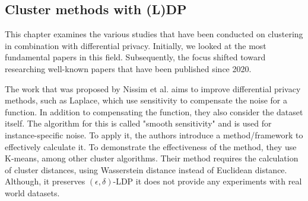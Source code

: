 \subsection{Cluster methods with (L)DP}
This chapter examines the various studies that have been conducted on clustering in combination with differential privacy.
Initially, we looked at the most fundamental papers in this field. Subsequently, the focus shifted toward researching well-known papers that have been published since 2020.

The work that was proposed by Nissim et al. aims to improve differential privacy methods, such as Laplace, which use sensitivity to compensate the noise for a function.
In addition to compensating the function, they also consider the dataset itself.
The algorithm for this is called "smooth sensitivity" and is used for instance-specific noise.
To apply it, the authors introduce a method/framework to effectively calculate it.
To demonstrate the effectiveness of the method, they use K-means, among other cluster algorithms.
Their method requires the calculation of cluster distances, using Wasserstein distance instead of Euclidean distance.
Although, it preserves $(\epsilon, \delta)$-LDP it does not provide any experiments with real world datasets.\

